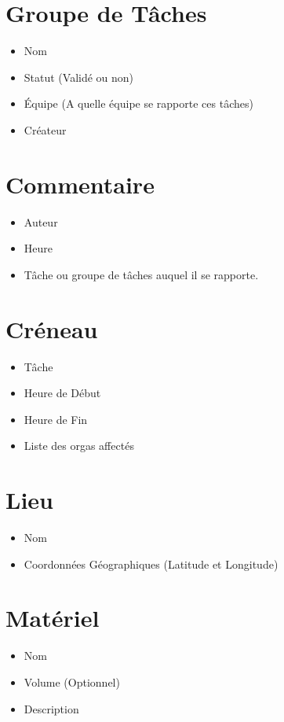 \section{Groupe de Tâches}
\begin{itemize}
 \item Nom
\item Statut (Validé ou non)
\item Équipe (A quelle équipe se rapporte ces tâches)
\item Créateur

\end{itemize}

\section{Commentaire}
\begin{itemize}
 \item Auteur
\item Heure
\item Tâche ou groupe de tâches auquel il se rapporte.

\end{itemize}


\section{Créneau}
\begin{itemize}
 \item Tâche
\item Heure de Début
\item Heure de Fin
\item Liste des orgas affectés
\end{itemize}

\section{Lieu}
\begin{itemize}
\item Nom
\item Coordonnées Géographiques (Latitude et Longitude)
\end{itemize}



\section{Matériel}
\begin{itemize}
\item Nom
\item Volume (Optionnel)
\item Description

\end{itemize}



